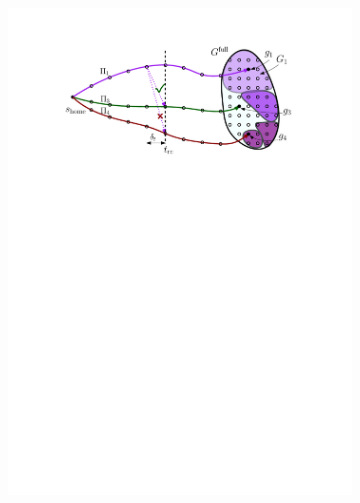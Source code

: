 \documentclass[conference]{IEEEtran}
\begin{document}
\begin{figure}[t]
\begin{subfigure}{.225\textwidth}
        \includegraphics[width=\textwidth]{3_preprocess_loop_4}
        \caption{}
        \label{fig:pl4}
    \end{subfigure}
    \begin{subfigure}{0.225\textwidth}

\end{subfigure}
\end{figure}
\end{document}
